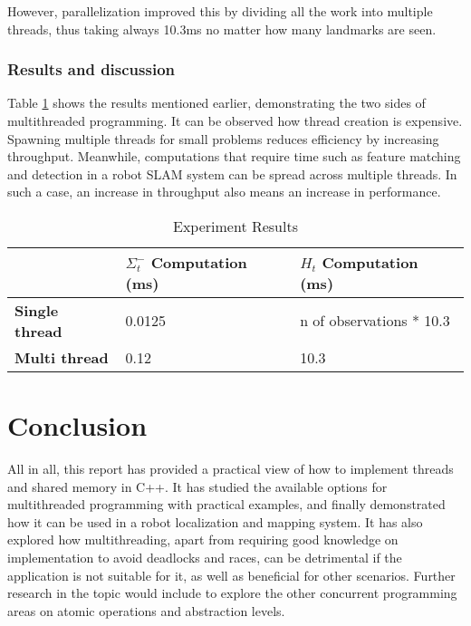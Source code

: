 \documentclass[conference]{IEEEtran}
\begin{document}
However, parallelization improved this by dividing all the work into multiple threads, thus taking always 10.3ms no matter how many landmarks are seen. 

\subsubsection{Results and discussion}

Table \ref{table:res} shows the results mentioned earlier, demonstrating the two sides of multithreaded programming. It can be observed how thread creation is expensive. Spawning multiple threads for small problems reduces efficiency by increasing throughput. Meanwhile, computations that require time such as feature matching and detection in a robot SLAM system can be spread across multiple threads. In such a case, an increase in throughput also means an increase in performance. 

\begin{table}[!h]
\begin{tabular}{|l|l|l|}
\hline
\textbf{} & \textbf{$\Sigma_t^-$ Computation (ms)} & \textbf{$H_t$ Computation (ms)} \\ \hline
\textbf{Single thread}          & 0.0125                                                                & n of observations * 10.3       \\ \hline
\textbf{Multi thread}           & 0.12                                                                  & 10.3                           \\ \hline
\end{tabular}\caption{\label{table:res}Experiment Results} 
\end{table}

\section{Conclusion}
All in all, this report has provided a practical view of how to implement threads and shared memory in C++. It has studied the available options for multithreaded programming with practical examples, and finally demonstrated how it can be used in a robot localization and mapping system. It has also explored how multithreading, apart from requiring good knowledge on implementation to avoid deadlocks and races, can be detrimental if the application is not suitable for it, as well as beneficial for other scenarios. Further research in the topic would include to explore the other concurrent programming areas on atomic operations and abstraction levels. 
\end{document}
